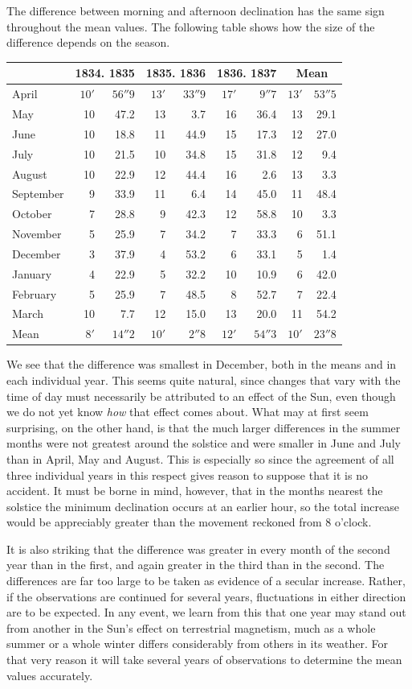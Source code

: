 The difference between morning and afternoon declination has the same sign throughout the mean values. The following table shows how the size of the difference depends on the season.
\begin{center}\small
\begin{tabular}{l||rr|rr|rr||rr}
&\multicolumn{2}{c|}{1834. 1835}&\multicolumn{2}{c|}{1835. 1836}&\multicolumn{2}{c||}{1836. 1837}&\multicolumn{2}{c}{Mean}\\\hline\hline
April&$10'$&$56''9$&$13'$&$33''9$&$17'$&$9''7$&$13'$&$53''5$\\
May&10&47.2&13&3.7&16&36.4&13&29.1\\
June&10&18.8&11&44.9&15&17.3&12&27.0\\
July&10&21.5&10&34.8&15&31.8&12&9.4\\
August&10&22.9&12&44.4&16&2.6&13&3.3\\
September&9&33.9&11&6.4&14&45.0&11&48.4\\
October&7&28.8&9&42.3&12&58.8&10&3.3\\
November&5&25.9&7&34.2&7&33.3&6&51.1\\
December&3&37.9&4&53.2&6&33.1&5&1.4\\
January&4&22.9&5&32.2&10&10.9&6&42.0\\
February&5&25.9&7&48.5&8&52.7&7&22.4\\
March&10&7.7&12&15.0&13&20.0&11&54.2\\\hline\hline
Mean&$8'$&$14''2$&$10'$&$2''8$&$12'$&$54''3$&$10'$&$23''8$
\end{tabular}
\end{center}
We see that the difference was smallest in December, both in the means and in each individual year. This seems quite natural, since changes that vary with the time of day must necessarily be attributed to an effect of the Sun, even though we do not yet know \textit{how} that effect comes about. What may at first seem surprising, on the other hand, is that the much larger differences in the summer months were not greatest around the
solstice and were smaller in June and July than in April, May and August. This is especially so since the agreement of all three individual years in this respect gives reason to suppose that it is no accident. It must be borne in mind, however, that in the months nearest the solstice the minimum declination occurs at an earlier hour, so the total increase would be appreciably greater than the movement reckoned from 8 o’clock.

It is also striking that the difference was greater in every month of the second year than in the first, and again greater in the third than in the second. The differences are far too large to be taken as evidence of a secular increase. Rather, if the observations are continued for several years, fluctuations in either direction are to be expected. In any event, we learn from this that one year may stand out from another in the Sun’s effect on terrestrial magnetism, much as a whole summer or a whole winter differs considerably from others in its weather. For that very reason it will take several years of observations to determine the mean values accurately.

